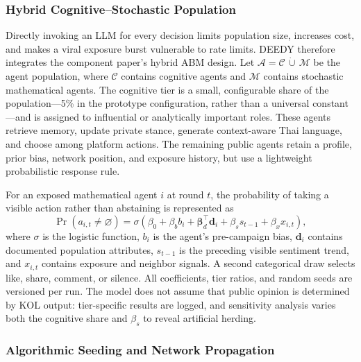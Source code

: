 \documentclass[conference]{IEEEtran}
\begin{document}
\subsubsection{Hybrid Cognitive--Stochastic Population}

Directly invoking an LLM for every decision limits population size, increases
cost, and makes a viral exposure burst vulnerable to rate limits. DEEDY
therefore integrates the component paper's hybrid ABM design. Let
$\mathcal{A}=\mathcal{C}\,\dot\cup\,\mathcal{M}$ be the agent population, where
$\mathcal{C}$ contains cognitive agents and $\mathcal{M}$ contains stochastic
mathematical agents. The cognitive tier is a small, configurable share of the
population---5\% in the prototype configuration, rather than a universal
constant---and is assigned to influential or analytically important roles.
These agents retrieve memory, update private stance, generate context-aware
Thai language, and choose among platform actions. The remaining public agents
retain a profile, prior bias, network position, and exposure history, but use a
lightweight probabilistic response rule.

For an exposed mathematical agent $i$ at round $t$, the probability of taking
a visible action rather than abstaining is represented as
\begin{equation}
    \Pr(a_{i,t}\neq\varnothing)=\sigma\!\left(
    \beta_0 + \beta_b b_i + \boldsymbol{\beta}_d^{\top}\mathbf{d}_i
    + \beta_s s_{t-1} + \beta_x x_{i,t}\right),
    \label{eq:hybrid-response}
\end{equation}
where $\sigma$ is the logistic function, $b_i$ is the agent's pre-campaign
bias, $\mathbf{d}_i$ contains documented population attributes, $s_{t-1}$ is
the preceding visible sentiment trend, and $x_{i,t}$ contains exposure and
neighbor signals. A second categorical draw selects like, share, comment, or
silence. All coefficients, tier ratios, and random seeds are versioned per run.
The model does not assume that public opinion is determined by KOL output:
tier-specific results are logged, and sensitivity analysis varies both the
cognitive share and $\beta_s$ to reveal artificial herding.

\subsubsection{Algorithmic Seeding and Network Propagation}
\end{document}
